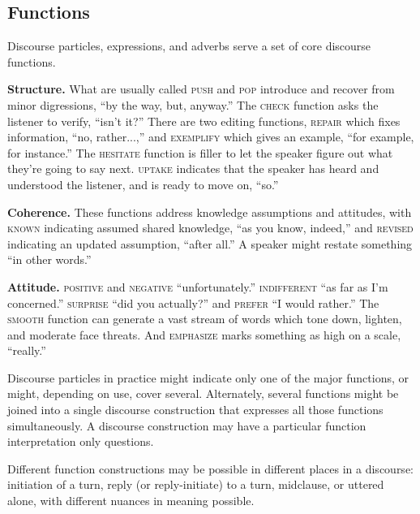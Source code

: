 \documentclass[11pt]{article}
\newcommand{\I}[1]{\textsc{#1}}   %
\begin{document}
\subsection{Functions} Discourse particles, expressions, and adverbs
serve a set of core discourse functions.

\textbf{Structure.} What are usually called \I{push} and \I{pop}
introduce and recover from minor digressions, ``by the way, but,
anyway.''  The \I{check} function asks the listener to verify, ``isn't
it?''  There are two editing functions, \I{repair} which fixes
information, ``no, rather...,'' and \I{exemplify} which gives an
example, ``for example, for instance.''  The \I{hesitate} function is
filler to let the speaker figure out what they're going to say next.
\I{uptake} indicates that the speaker has heard and understood the
listener, and is ready to move on, ``so.''

\textbf{Coherence.} These functions address knowledge assumptions and
attitudes, with \I{known} indicating assumed shared knowledge, ``as
you know, indeed,'' and \I{revised} indicating an updated assumption,
``after all.''  A speaker might restate something ``in other words.''

\textbf{Attitude.} \I{positive} and \I{negative} ``unfortunately.''
\I{indifferent} ``as far as I'm concerned.''  \I{surprise} ``did you
actually?'' and \I{prefer} ``I would rather.''  The \I{smooth}
function can generate a vast stream of words which tone down, lighten,
and moderate face threats.  And \I{emphasize} marks something as high
on a scale, ``really.''

Discourse particles in practice might indicate only one of the major
functions, or might, depending on use, cover several.  Alternately,
several functions might be joined into a single discourse construction
that expresses all those functions simultaneously.  A discourse
construction may have a particular function interpretation only
questions.

Different function constructions may be possible in different places
in a discourse: initiation of a turn, reply (or reply-initiate) to a
turn, midclause, or uttered alone, with different nuances in meaning
possible. 
\end{document}
